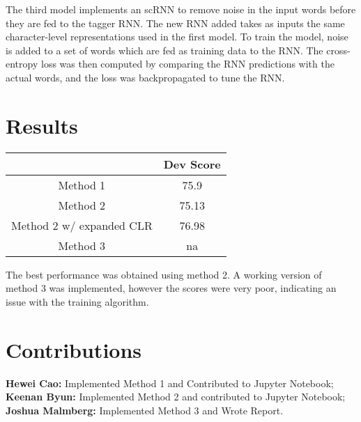 \documentclass[letter]{article}
\numberwithin{equation}{section}
\newcommand{\0}{\mathbf{0}}
\begin{document}
	The third model implements an scRNN to remove noise in the input words before they are fed to the tagger RNN. The new RNN added takes as inputs the same character-level representations used in the first model. To train the model, noise is added to a set of words which are fed as training data to the RNN. The cross-entropy loss was then computed by comparing the RNN predictions with the actual words, and the loss was backpropagated to tune the RNN.\newline


\section{Results}

\begin{center}
\begin{tabular}{ |c|c| } 
 \hline
   & Dev Score  \\ 
\hline
Method 1 & 75.9  \\  
Method 2 & 75.13 \\
Method 2 w/ expanded CLR & 76.98 \\
Method 3 & na \\
 \hline
\end{tabular}
\end{center}

	The best performance was obtained using method 2. A working version of method 3 was implemented, however the scores were very poor, indicating an issue with the training algorithm.

\section{Contributions}

\textbf{Hewei Cao:} Implemented Method 1 and Contributed to Jupyter Notebook; \textbf{Keenan Byun:} Implemented Method 2 and contributed to Jupyter Notebook; \textbf{Joshua Malmberg:} Implemented Method 3 and Wrote Report.
\end{document}
